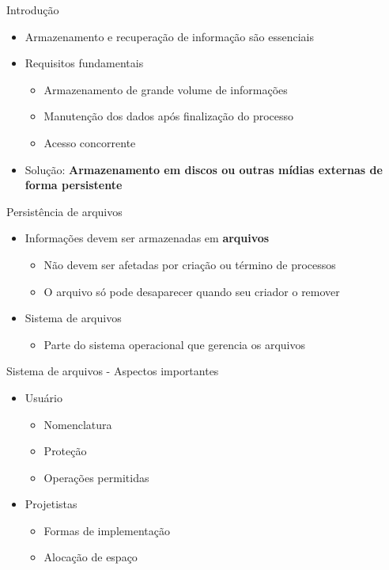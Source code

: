 \documentclass[aspectratio=169,
				xcolor=table]{beamer}
\begin{document}
	\begin{frame}{Introdução}
		\begin{itemize}
			\item Armazenamento e recuperação de informação são essenciais
			\vspace{1em}
			\item Requisitos fundamentais
			\begin{itemize}
				\item Armazenamento de grande volume de informações
				\item Manutenção dos dados após finalização do processo
				\item Acesso concorrente
			\end{itemize}
			\vspace{2em}
			\item \alert{Solução:} \textbf{Armazenamento em discos ou outras mídias externas de forma persistente}			
			
		\end{itemize}
	\end{frame}
	
	\begin{frame}{Persistência de arquivos}
		\begin{itemize}
			\item Informações devem ser armazenadas em \textbf{arquivos}
			\begin{itemize}
				\item Não devem ser afetadas por criação ou término de processos
				\item O arquivo só pode desaparecer quando seu criador o remover
			\end{itemize}
			\vspace{1.5em}
			\item Sistema de arquivos
			\begin{itemize}
				\item Parte do sistema operacional que gerencia os arquivos
			\end{itemize}
		\end{itemize}
		
	\end{frame}
	\begin{frame}{Sistema de arquivos - Aspectos importantes}
		\begin{itemize}
			\item Usuário
			\begin{itemize}
				\item Nomenclatura
				\item Proteção
				\item Operações permitidas
			\end{itemize}
			\vspace{1em}
			\item Projetistas
			\begin{itemize}
				\item Formas de implementação
				\item Alocação de espaço
			\end{itemize}
		\end{itemize}
		
	\end{frame}
	
\end{document}
